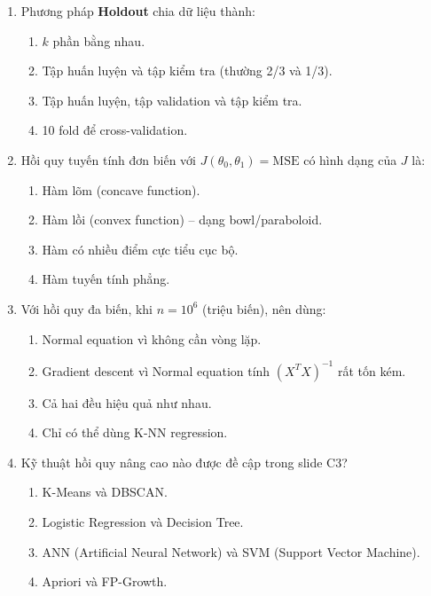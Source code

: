 \documentclass[10pt]{article}
\begin{document}
\begin{enumerate}[leftmargin=*, label=\textbf{Câu \arabic*.}]
    \item Phương pháp \textbf{Holdout} chia dữ liệu thành:
    \begin{enumerate}[label=\Alph*.]
        \item $k$ phần bằng nhau.
        \item Tập huấn luyện và tập kiểm tra (thường 2/3 và 1/3).
        \item Tập huấn luyện, tập validation và tập kiểm tra.
        \item 10 fold để cross-validation.
    \end{enumerate}

    \item Hồi quy tuyến tính đơn biến với $J(\theta_0, \theta_1) = \text{MSE}$ có hình dạng của $J$ là:
    \begin{enumerate}[label=\Alph*.]
        \item Hàm lõm (concave function).
        \item Hàm lồi (convex function) -- dạng bowl/paraboloid.
        \item Hàm có nhiều điểm cực tiểu cục bộ.
        \item Hàm tuyến tính phẳng.
    \end{enumerate}

    \item Với hồi quy đa biến, khi $n = 10^6$ (triệu biến), nên dùng:
    \begin{enumerate}[label=\Alph*.]
        \item Normal equation vì không cần vòng lặp.
        \item Gradient descent vì Normal equation tính $(X^TX)^{-1}$ rất tốn kém.
        \item Cả hai đều hiệu quả như nhau.
        \item Chỉ có thể dùng K-NN regression.
    \end{enumerate}

    \item Kỹ thuật hồi quy nâng cao nào được đề cập trong slide C3?
    \begin{enumerate}[label=\Alph*.]
        \item K-Means và DBSCAN.
        \item Logistic Regression và Decision Tree.
        \item ANN (Artificial Neural Network) và SVM (Support Vector Machine).
        \item Apriori và FP-Growth.
    \end{enumerate}


\end{enumerate}
\end{document}
